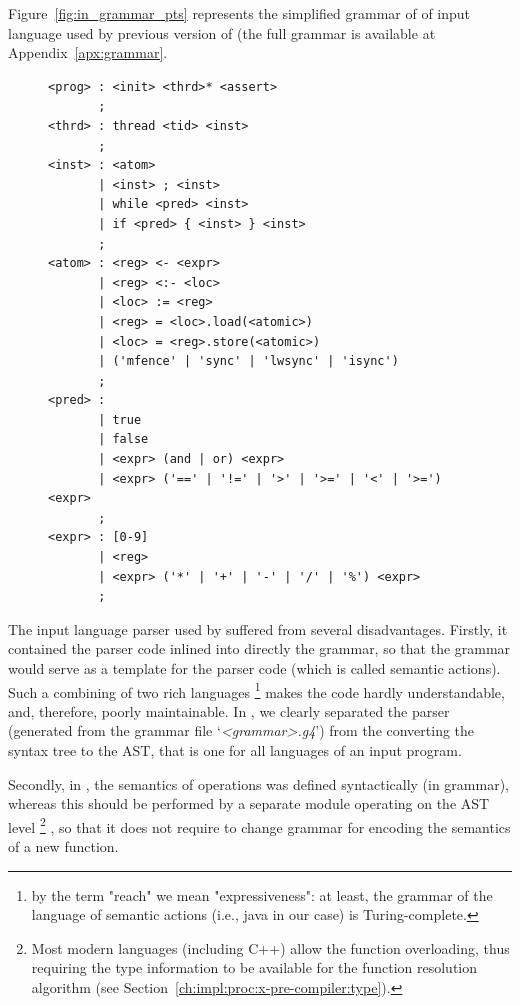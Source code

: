 Figure~\ref{fig:in_grammar_pts} represents the simplified grammar of of input language used by previous version of \porthos{} (the full  grammar is available at Appendix~\ref{apx:grammar}.

\begin{figure}[!h]%
\centering
\begin{lstlisting}[language=antlr,
                  basicstyle=\ttfamily\tiny,
                  caption={The sketch of the input language grammar used by \oldporthos},%
                  label={fig:in_grammar_pts}]
<prog> : <init> <thrd>* <assert>
       ;
<thrd> : thread <tid> <inst>
       ;
<inst> : <atom>
       | <inst> ; <inst>
       | while <pred> <inst>
       | if <pred> { <inst> } <inst>
       ;
<atom> : <reg> <- <expr>
       | <reg> <:- <loc>
       | <loc> := <reg>
       | <reg> = <loc>.load(<atomic>)
       | <loc> = <reg>.store(<atomic>)
       | ('mfence' | 'sync' | 'lwsync' | 'isync')
       ;
<pred> :
       | true
       | false
       | <expr> (and | or) <expr>
       | <expr> ('==' | '!=' | '>' | '>=' | '<' | '>=') <expr>
       ;
<expr> : [0-9]
       | <reg>
       | <expr> ('*' | '+' | '-' | '/' | '%') <expr>
       ;
\end{lstlisting}
\end{figure}

The input language parser used by \porthos[1] suffered from several disadvantages.
Firstly, it contained the parser code inlined into directly the grammar, so that the grammar would serve as a template for the parser code (which is called semantic actions). Such a combining of two rich languages%
\footnote{by the term "reach" we mean "expressiveness": at least, the grammar of the language of semantic actions (i.e., java in our case) is Turing-complete.} %
makes the code hardly understandable, and, therefore, poorly maintainable. In \porthos[2], we clearly separated the parser (generated from the grammar file `\textit{<grammar>.g4}') from the converting the  syntax tree to the AST, that is one for all  languages of an input program.

Secondly, in \porthos[1], the semantics of operations was defined syntactically (in  grammar), whereas this should be performed by a separate module operating on the AST level%
\footnote{Most modern languages (including C++) allow the function overloading, thus requiring the type information to be available for the function resolution algorithm (see Section~\ref{ch:impl:proc:x-pre-compiler:type}).}%
, so that it does not require to change grammar for encoding the semantics of a new function. %

